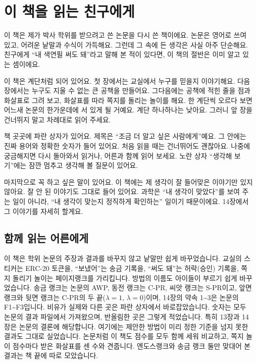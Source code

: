\chapter*{이 책을 읽는 친구에게}

이 책은 제가 박사 학위를 받으려고 쓴 논문을 다시 쓴 책이에요.
논문은 영어로 쓰여 있고, 어려운 낱말과 수식이 가득해요.
그런데 그 속에 든 생각은 사실 아주 단순해요.
친구에게 “내 색연필 써도 돼”라고 말해 본 적이 있다면, 이 책의 절반은 이미 알고 있는 셈이에요.

이 책은 계단처럼 되어 있어요.
첫 장에서는 교실에서 누구를 믿을지 이야기해요.
다음 장에서는 누구도 지울 수 없는 큰 공책을 만들어요.
그다음에는 공책에 적힌 줄을 점과 화살표로 그려 보고, 화살표를 따라 쪽지를 돌리는 놀이를 해요.
한 계단씩 오르다 보면 어느새 논문의 한가운데에 서 있게 될 거예요.
계단 하나하나는 낮아요.
그러니 앞 장을 건너뛰지 말고 차례대로 읽어 주세요.

책 곳곳에 파란 상자가 있어요.
제목은 “조금 더 알고 싶은 사람에게”예요.
그 안에는 진짜 용어와 정확한 숫자가 들어 있어요.
처음 읽을 때는 건너뛰어도 괜찮아요.
나중에 궁금해지면 다시 돌아와서 읽거나, 어른과 함께 읽어 보세요.
노란 상자 “생각해 보기”에는 잠깐 멈추고 생각해 볼 질문이 있어요.

마지막으로 꼭 하고 싶은 말이 있어요.
이 책에는 제 생각이 잘 들어맞은 이야기만 있지 않아요.
잘 안 된 이야기도 그대로 들어 있어요.
과학은 “내 생각이 맞았다”를 보여 주는 일이 아니라,
“내 생각이 맞는지 정직하게 확인하는” 일이기 때문이에요.
14장에서 그 이야기를 자세히 할게요.

\section{함께 읽는 어른에게}

이 책은 학위 논문의 주장과 결과를 바꾸지 않고 낱말만 쉽게 바꾸었습니다.
교실의 스티커는 ERC-20 토큰을, “보냈어”는 송금 기록을, “써도 돼”는 허락(승인) 기록을, 쪽지 돌리기 놀이는 페이지랭크를 가리킵니다.
방법의 이름도 아이들이 부르기 쉽게 바꾸었습니다.
송금 랭크는 논문의 AWP, 동전 랭크는 C-PR, 씨앗 랭크는 S-PR이고, 앞면 랭크와 뒷면 랭크는 C-PR의 두 끝($\lambda=1$, $\lambda=0$)이며, 14장의 약속 1\textasciitilde{}3은 논문의 F1\textasciitilde{}F3입니다.
비유가 실제와 다른 곳은 파란 상자에서 바로잡았습니다.
숫자는 모두 논문의 결과 파일에서 가져왔으며, 반올림한 곳은 그렇게 적었습니다.
특히 13장과 14장은 논문의 결론에 해당합니다.
여기에는 제안한 방법이 미리 정한 기준을 넘지 못한 결과도 그대로 실었습니다.
논문처럼 이 책도 점수를 모두 함께 세워 비교하고, 쪽지 놀이 점수마다 받은 화살표를 센 수와 견줍니다.
엔도스랭크와 송금 랭크 둘만 맞대어 본 결과는 책 끝에 따로 모았습니다.
